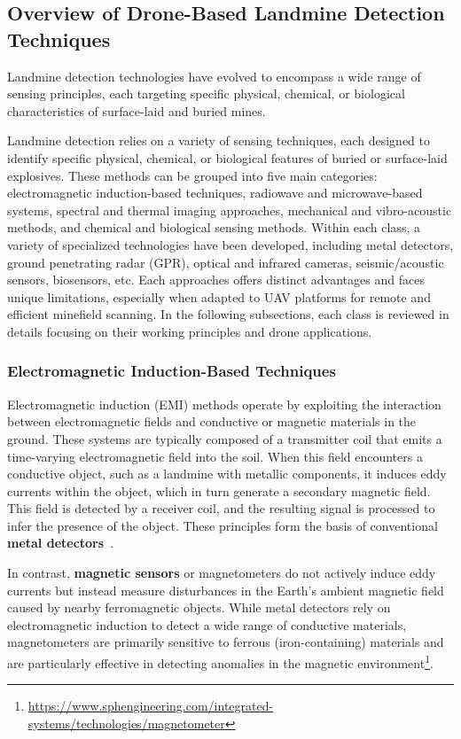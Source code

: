 \subsection{Overview of Drone-Based Landmine Detection Techniques}

Landmine detection technologies have evolved to encompass a wide range of sensing principles, each targeting specific physical, chemical, or biological characteristics of surface-laid and buried mines. 

Landmine detection relies on a variety of sensing techniques, each designed to identify specific physical, chemical, or biological features of buried or surface-laid explosives. These methods can be grouped into five main categories: electromagnetic induction-based techniques, radiowave and microwave-based systems, spectral and thermal imaging approaches, mechanical and vibro-acoustic methods, and chemical and biological sensing methods. Within each class, a variety of specialized technologies have been developed, including metal detectors, ground penetrating radar (GPR), optical and infrared cameras, seismic/acoustic sensors, biosensors, etc. Each approaches offers distinct advantages and faces unique limitations, especially when adapted to UAV platforms for remote and efficient minefield scanning. In the following subsections, each class is reviewed in details focusing on their working principles and drone applications.



\subsubsection{Electromagnetic Induction-Based Techniques}

Electromagnetic induction (EMI) methods operate by exploiting the interaction between electromagnetic fields and conductive or magnetic materials in the ground. These systems are typically composed of a transmitter coil that emits a time-varying electromagnetic field into the soil. When this field encounters a conductive object, such as a landmine with metallic components, it induces eddy currents within the object, which in turn generate a secondary magnetic field. This field is detected by a receiver coil, and the resulting signal is processed to infer the presence of the object. These principles form the basis of conventional \textbf{metal detectors}~\cite{gichd2006guidebook}.

In contrast, \textbf{magnetic sensors} or magnetometers do not actively induce eddy currents but instead measure disturbances in the Earth's ambient magnetic field caused by nearby ferromagnetic objects. While metal detectors rely on electromagnetic induction to detect a wide range of conductive materials, magnetometers are primarily sensitive to ferrous (iron-containing) materials and are particularly effective in detecting anomalies in the magnetic environment\footnote{\url{https://www.sphengineering.com/integrated-systems/technologies/magnetometer}}.

